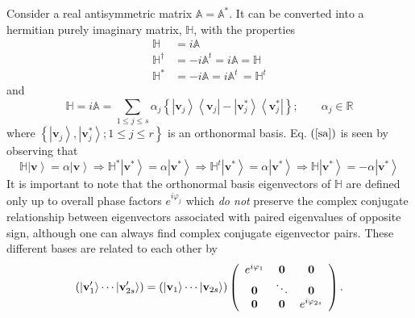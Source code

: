 \documentclass[preprint,aps,showkeys]{revtex4}%
\begin{document}
Consider a real antisymmetric\emph{ }matrix $\mathbb{A}=\mathbb{A}^{\ast}.$ It
can be converted into a hermitian purely imaginary matrix, $\mathbb{H}$, with
the properties
\begin{align}
\mathbb{H}  &  =i\mathbb{A}\nonumber\\
\mathbb{H}^{\dagger}  &  =-i\mathbb{A}^{t}=i\mathbb{A}=\mathbb{H}\nonumber\\
\mathbb{H}^{\ast}  &  =-i\mathbb{A}=i\mathbb{A}^{t}\,=\mathbb{H}^{t}%
\end{align}
and
\begin{equation}
\mathbb{H}=i\mathbb{A}=\sum_{1\leq j\leq s}\alpha_{j}\left\{  \left\vert
\mathbf{v}_{j}\right\rangle \left\langle \mathbf{v}_{j}\right\vert -\left\vert
\mathbf{v}_{j}^{\ast}\right\rangle \left\langle \mathbf{v}_{j}^{\ast
}\right\vert \right\}  ;\qquad\alpha_{j}\in\mathbb{R} \label{sa}%
\end{equation}
where $\left\{  \left\vert \mathbf{v}_{j}\right\rangle ,\left\vert
\mathbf{v}_{j}^{\ast}\right\rangle ;1\leq j\leq r\right\}  $ is an orthonormal
basis. Eq. $\left(  \ref{sa}\right)  $ is seen by observing that
\begin{equation}
\mathbb{H}\left\vert \mathbf{v}\right\rangle =\alpha\left\vert \mathbf{v}%
\right\rangle \Rightarrow\mathbb{H}^{\ast}\left\vert \mathbf{v}^{\ast
}\right\rangle =\alpha\left\vert \mathbf{v}^{\ast}\right\rangle \Rightarrow
\mathbb{H}^{t}\left\vert \mathbf{v}^{\ast}\right\rangle =\alpha\left\vert
\mathbf{v}^{\ast}\right\rangle \Rightarrow\mathbb{H}\left\vert \mathbf{v}%
^{\ast}\right\rangle =-\alpha\left\vert \mathbf{v}^{\ast}\right\rangle
\end{equation}
It is important to note that the orthonormal basis eigenvectors of
$\mathbb{H}$ are defined only up to overall phase factors $e^{i\varphi_{j}}$
which \emph{do not} preserve the complex conjugate relationship between
eigenvectors associated with paired eigenvalues of opposite sign, although one
can always find complex conjugate eigenvector pairs. These different bases are
related to each other by
\begin{equation}
\left(  \left\vert \mathbf{v}_{1}^{\prime}\right\rangle \cdots\left\vert
\mathbf{v}_{2s}^{\prime}\right\rangle \right)  =\left(  \left\vert
\mathbf{v}_{1}\right\rangle \cdots\left\vert \mathbf{v}_{2s}\right\rangle
\right)  \left(
\begin{array}
[c]{ccc}%
e^{i\varphi_{1}} & \mathbf{0} & \mathbf{0}\\
\mathbf{0} & \ddots & \mathbf{0}\\
\mathbf{0} & \mathbf{0} & e^{i\varphi_{2s}}%
\end{array}
\right)  .
\end{equation}
\end{document}

